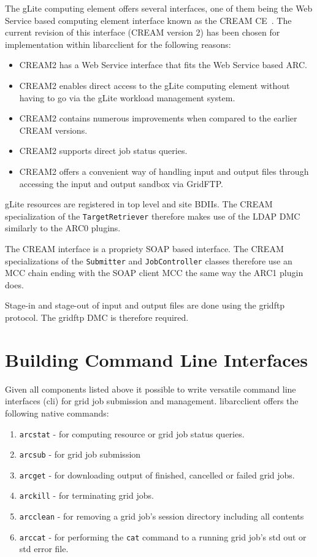 \documentclass{book}
\newcommand{\arclib}{libarcclient}
\newcommand{\JobController}{\texttt{JobController}}
\newcommand{\TargetRetriever}{\texttt{TargetRetriever}}
\newcommand{\Submitter}{\texttt{Submitter}}
\begin{document}
The gLite computing element offers several interfaces, one of them
being the Web Service based computing element interface known as the
CREAM CE~\cite{cream}. The current revision of this interface (CREAM
version 2) has been chosen for implementation within {\arclib} for the
following reasons:

\begin{itemize}
\item CREAM2 has a Web Service interface that fits the Web Service
  based ARC.
\item CREAM2 enables direct access to the gLite computing element
  without having to go via the gLite workload management system.
\item CREAM2 contains numerous improvements when compared to the
  earlier CREAM versions.
\item CREAM2 supports direct job status queries.
\item CREAM2 offers a convenient way of handling input and output
  files through accessing the input and output sandbox via GridFTP.
\end{itemize}

gLite resources are registered in top level and site BDIIs. The CREAM
specialization of the {\TargetRetriever} therefore makes use of the
LDAP DMC similarly to the ARC0 plugins.

The CREAM interface is a propriety SOAP based interface. The CREAM
specializations of the {\Submitter} and {\JobController} classes
therefore use an MCC chain ending with the SOAP client MCC the same 
way the ARC1 plugin does.

Stage-in and stage-out of input and output files are done using the
gridftp protocol. The gridftp DMC is therefore required.

\chapter{Building Command Line Interfaces}
\label{sec:cli}

Given all components listed above it possible to write versatile
command line interfaces (cli) for grid job submission and
management. {\arclib} offers the following native commands:

\begin{enumerate}
\item{\texttt{arcstat} - for computing resource or grid job status
  queries.}
\item{\texttt{arcsub} - for grid job submission}
\item{\texttt{arcget} - for downloading output of finished, cancelled
  or failed grid jobs.}
\item{\texttt{arckill} - for terminating grid jobs.}
\item{\texttt{arcclean} - for removing a grid job's session directory
  including all contents}
\item{\texttt{arccat} - for performing the \texttt{cat} command to a
  running grid job's std out or std error file.}
\end{enumerate}
\end{document}
